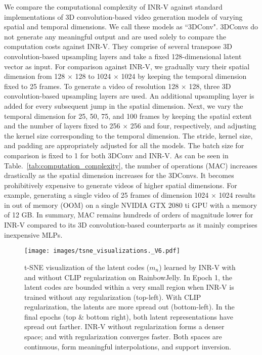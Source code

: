 \documentclass[10pt]{article} \usepackage[accepted]{tmlr}
\begin{document}
We compare the computational complexity of INR-V against standard implementations of 3D convolution-based video generation models of varying spatial and temporal dimensions. We call these models as ``3DConv". 3DConvs do not generate any meaningful output and are used solely to compare the computation costs against INR-V. They comprise of several transpose 3D convolution-based upsampling layers and take a fixed 128-dimensional latent vector as input. For comparison against INR-V, we gradually vary their spatial dimension from 128 $\times$ 128 to 1024 $\times$ 1024 by keeping the temporal dimension fixed to 25 frames. To generate a video of resolution 128 $\times$ 128, three 3D convolution-based upsampling layers are used.
An additional upsampling layer is added for every subsequent jump in the spatial dimension. Next, we vary the temporal dimension for 25, 50, 75, and 100 frames by keeping the spatial extent and the number of layers fixed to 256 $\times$ 256 and four, respectively, and adjusting the kernel size corresponding to the temporal dimension. The stride, kernel size, and padding are appropriately adjusted for all the models. The batch size for comparison is fixed to 1 for both 3DConv and INR-V. As can be seen in Table.~\ref{tab:computation_complexity}, the number of operations (MAC) increases drastically as the spatial dimension increases for the 3DConvs. It becomes prohibitively expensive to generate videos of higher spatial dimensions. For example, generating a single video of 25 frames of dimension 1024 $\times$ 1024 results in out of memory (OOM) on a single NVIDIA GTX 2080 ti GPU with a memory of 12 GB. In summary, MAC remains hundreds of orders of magnitude lower for INR-V compared to its 3D convolution-based counterparts as it mainly comprises inexpensive MLPs.


\begin{figure}[]
  \centering
  \texttt{[image: images/tsne\_visualizations.\_V6.pdf]}
  \caption{t-SNE visualization of the latent codes ($m_n$) learned by INR-V with and without CLIP regularization on RainbowJelly. In Epoch 1, the latent codes are bounded within a very small region when INR-V is trained without any regularization (top-left). With CLIP regularization, the latents are more spread out (bottom-left). In the final epochs (top \& bottom right), both latent representations have spread out farther. INR-V without regularization forms a denser space; and with regularization converges faster. Both spaces are continuous, form meaningful interpolations, and support inversion.}
  \label{fig:tsnevisualization}
\end{figure}
\end{document}
